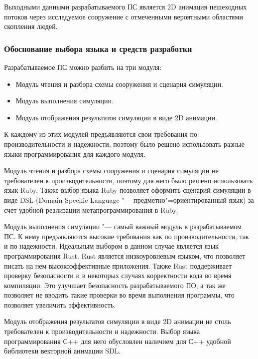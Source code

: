 Выходными данными разрабатываемого ПС является 2D анимация пешеходных потоков через исследуемое сооружение с отмеченными вероятными областями скопления людей.

\subsubsection{Обоснование выбора языка и средств разработки}
\label{sub:domain:requirements:purpose}

Разрабатываемое ПС можно разбить на три модуля:
\begin{itemize}
  \item Модуль чтения и разбора схемы сооружения и сценария симуляции.
  \item Модуль выполнения симуляции.
  \item Модуль отображения результатов симуляции в виде 2D анимации.
\end{itemize}

К каждому из этих модулей предъявляются свои требования по производительности и надежности, поэтому было решено использовать разные языки программирования для каждого модуля.

Модуль чтения и разбора схемы сооружения и сценария симуляции не требователен к производительности, поэтому для него было решено использовать язык Ruby.
Также выбор языка Ruby позволяет оформить сценарий симуляции в виде DSL (Domain Specific Language "--- предметно"=ориентированный язык) за счет удобной реализации метапрограммирования в Ruby.

Модуль выполнения симуляции "--- самый важный модуль в разрабатываемом ПС. К нему предъявляются высокие требования как по производительности, так и по надежности.
Идеальным выбором в данном случае является язык программирования Rust. Rust является низкоуровневым языком, что позволяет писать на нем высокоэффективные приложения.
Также Rust поддерживает проверку безопасности и в некоторых случаях корректности кода во время компиляции.
Это улучшает безопасность разрабатываемого ПО, а так же позволяет не вводить такие проверки во время выполнения программы, что позволяет увеличить эффективность.

Модуль отображения результатов симуляции в виде 2D анимации не столь требователен к производительности и надежности.
Выбор языка программирования С++ для него обусловлен наличием для С++ удобной библиотеки векторной анимации SDL.
